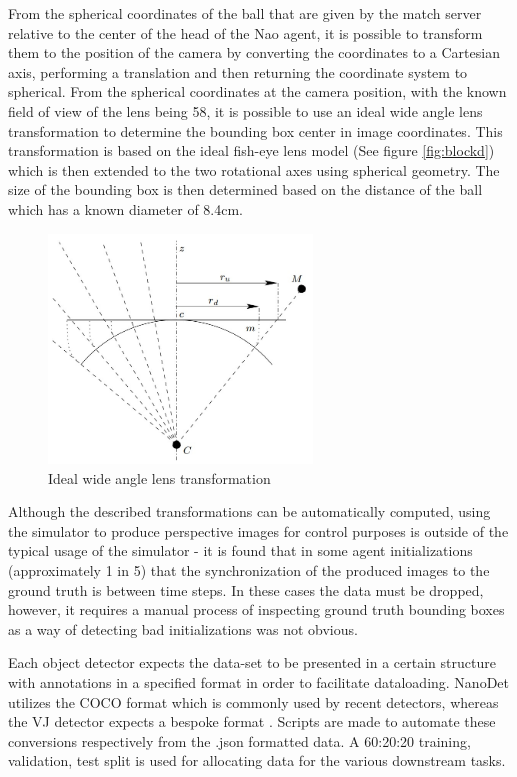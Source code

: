 \documentclass[a4paper,twoside,12pt]{report}
\begin{document}
From the spherical coordinates of the ball that are given by the match server relative to the center of the head of the Nao agent, it is possible to transform them to the position of the camera by converting the coordinates to a Cartesian axis, performing a translation and then returning the coordinate system to spherical. From the spherical coordinates at the camera position, with the known field of view of the lens being 58\textdegree, it is possible to use an ideal wide angle lens transformation to determine the bounding box center in image coordinates. This transformation is based on the ideal fish-eye lens model (See figure \ref{fig:blockd}) which is then extended to the two rotational axes using spherical geometry. The size of the bounding box is then determined based on the distance of the ball which has a known diameter of 8.4cm.

 \begin{figure}[h!]
\begin{center}
\includegraphics[width=7cm]{images/FOVmodel.jpg}
\caption{Ideal wide angle lens transformation \citep{wideangle} }
\label{fig:onnxplot}
\end{center}
\end{figure}

Although the described transformations can be automatically computed, using the simulator to produce perspective images for control purposes is outside of the typical usage of the simulator - it is found that in some agent initializations (approximately 1 in 5) that the synchronization of the produced images to the ground truth is between time steps. In these cases the data must be dropped, however, it requires a manual process of inspecting ground truth bounding boxes as a way of detecting bad initializations was not obvious. 

Each object detector expects the data-set to be presented in a certain structure with annotations in a specified format in order to facilitate dataloading. NanoDet utilizes the COCO format \citep{cocodataset} which is commonly used by recent detectors, whereas the VJ detector expects a bespoke format \citep{vjdataset}. Scripts are made to automate these conversions respectively from the .json formatted data. A 60:20:20 training, validation, test split is used for allocating data for the various downstream tasks.
\end{document}
